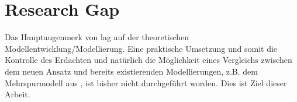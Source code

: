 \section{Research Gap}
\label{sec:researchgap}

Das Hauptaugenmerk von \cite{dat-ba} lag auf der theoretischen Modellentwicklung/Modellierung. Eine praktische Umsetzung und somit die Kontrolle des Erdachten und natürlich die Möglichkeit eines Vergleichs zwischen dem neuen Ansatz und bereits existierenden Modellierungen, z.B. dem Mehrspurmodell aus \cite{multi-lane}, ist bisher nicht durchgeführt worden. Dies ist Ziel dieser Arbeit.
